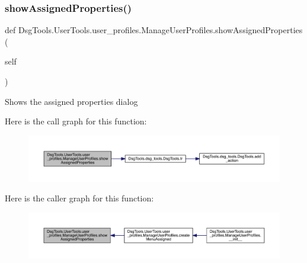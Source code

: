 \subsubsection{\texorpdfstring{show\+Assigned\+Properties()}{showAssignedProperties()}}
{\footnotesize\ttfamily def Dsg\+Tools.\+User\+Tools.\+user\+\_\+profiles.\+Manage\+User\+Profiles.\+show\+Assigned\+Properties (\begin{DoxyParamCaption}\item[{}]{self }\end{DoxyParamCaption})}

\begin{DoxyVerb}Shows the assigned properties dialog
\end{DoxyVerb}
 Here is the call graph for this function\+:
\nopagebreak
\begin{figure}[H]
\begin{center}
\leavevmode
\includegraphics[width=350pt]{class_dsg_tools_1_1_user_tools_1_1user__profiles_1_1_manage_user_profiles_a37b95df3524d16d437744c9a835251dd_cgraph}
\end{center}
\end{figure}
Here is the caller graph for this function\+:
\nopagebreak
\begin{figure}[H]
\begin{center}
\leavevmode
\includegraphics[width=350pt]{class_dsg_tools_1_1_user_tools_1_1user__profiles_1_1_manage_user_profiles_a37b95df3524d16d437744c9a835251dd_icgraph}
\end{center}
\end{figure}
\mbox{\label{class_dsg_tools_1_1_user_tools_1_1user__profiles_1_1_manage_user_profiles_a1beec4e431f3526c6f4efb5bcefca57d}} 
